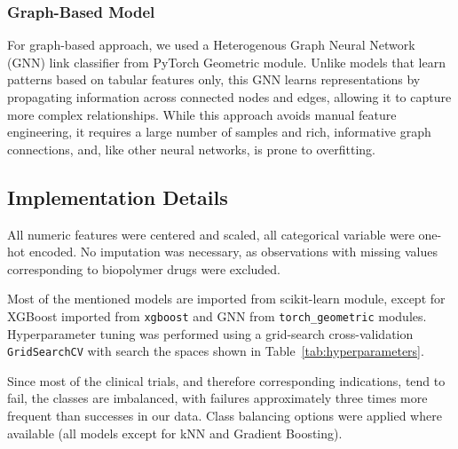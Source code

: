  \subsubsection{Graph-Based Model}

For graph-based approach, we used a Heterogenous Graph Neural Network (GNN) 
link classifier from PyTorch Geometric module.
Unlike models that learn patterns based on tabular features only, this GNN learns representations 
by propagating information across connected nodes and edges, allowing it to capture more complex relationships.
While this approach avoids manual feature engineering, it requires a large number of samples and 
rich, informative graph connections, and, like other neural networks, is prone to overfitting.

\subsection{Implementation Details}

All numeric features were centered and scaled, all categorical variable were one-hot encoded. 
No imputation was necessary, as observations with missing values corresponding to biopolymer drugs were excluded.

Most of the mentioned models are imported from scikit-learn module, except for XGBoost
imported from \verb|xgboost| and GNN from \verb|torch_geometric| modules. Hyperparameter tuning was performed
using a grid-search cross-validation \verb|GridSearchCV| with search the spaces shown 
in Table~\ref{tab:hyperparameters}.

Since most of the clinical trials, and therefore corresponding indications, tend to fail,
the classes are imbalanced, with failures approximately three times more frequent than successes in our data.
Class balancing options were applied where available (all models except for kNN and Gradient Boosting).

